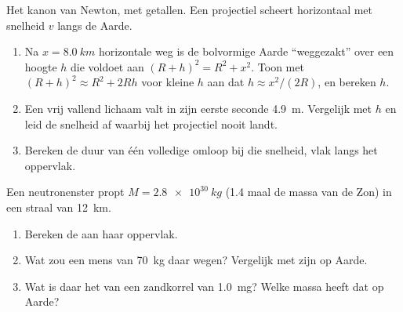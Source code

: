 \begin{exercise}[$\star\star\star$]\label{exo:g10:universal-gravitation:13}
Het kanon van Newton, met getallen. Een projectiel scheert horizontaal
met snelheid $v$ langs de Aarde.
\begin{enumerate}
  \item Na $x = \qty{8.0}{km}$ horizontale weg is de bolvormige Aarde
        ``weggezakt'' over een hoogte $h$ die voldoet aan
        $(R + h)^2 = R^2 + x^2$. Toon met
        $(R + h)^2 \approx R^2 + 2Rh$ voor kleine $h$ aan dat
        $h \approx x^2 / (2R)$, en bereken $h$.
  \item Een vrij vallend lichaam valt in zijn eerste seconde
        \qty{4.9}{m}. Vergelijk met $h$ en leid de snelheid af waarbij
        het projectiel nooit landt.
  \item Bereken de duur van één volledige omloop bij die snelheid, vlak
        langs het oppervlak.
\end{enumerate}
\end{exercise}

\begin{exercise}[$\star\star\star$]\label{exo:g10:universal-gravitation:14}
Een neutronenster propt $M = \qty{2.8e30}{kg}$ (1.4 maal de massa van de
Zon) in een straal van \qty{12}{km}.
\begin{enumerate}
  \item Bereken de  aan haar oppervlak.
  \item Wat zou een mens van \qty{70}{kg} daar wegen? Vergelijk met zijn
         op Aarde.
  \item Wat is daar het  van een zandkorrel van \qty{1.0}{mg}?
        Welke massa heeft dat  op Aarde?
\end{enumerate}
\end{exercise}

